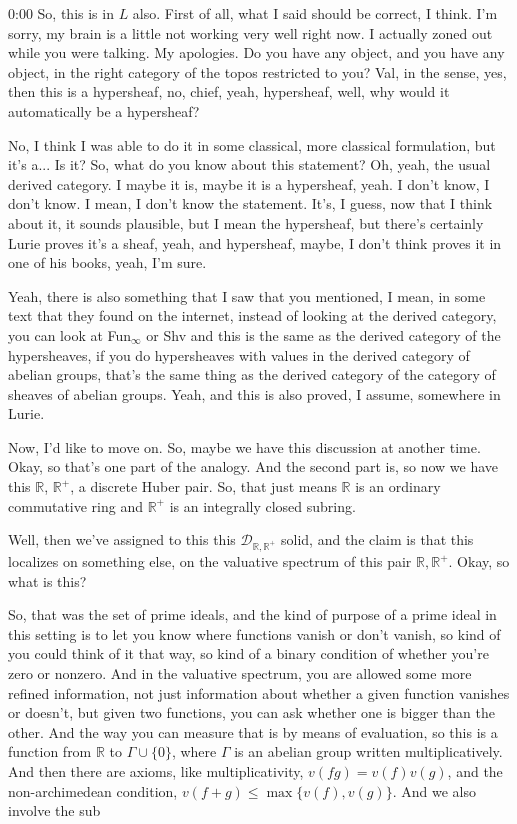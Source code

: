 \begin{unfinished}{0:00}
So, this is in $L$ also. First of all, what I said should be correct, I think. I'm sorry, my brain is a little not working very well right now. I actually zoned out while you were talking. My apologies. Do you have any object, and you have any object, in the right category of the topos restricted to you? Val, in the sense, yes, then this is a hypersheaf, no, chief, yeah, hypersheaf, well, why would it automatically be a hypersheaf?

No, I think I was able to do it in some classical, more classical formulation, but it's a... Is it? So, what do you know about this statement? Oh, yeah, the usual derived category. I maybe it is, maybe it is a hypersheaf, yeah. I don't know, I don't know. I mean, I don't know the statement. It's, I guess, now that I think about it, it sounds plausible, but I mean the hypersheaf, but there's certainly Lurie proves it's a sheaf, yeah, and hypersheaf, maybe, I don't think proves it in one of his books, yeah, I'm sure.

Yeah, there is also something that I saw that you mentioned, I mean, in some text that they found on the internet, instead of looking at the derived category, you can look at Fun$_\infty$ or Shv and this is the same as the derived category of the hypersheaves, if you do hypersheaves with values in the derived category of abelian groups, that's the same thing as the derived category of the category of sheaves of abelian groups. Yeah, and this is also proved, I assume, somewhere in Lurie.

Now, I'd like to move on. So, maybe we have this discussion at another time. Okay, so that's one part of the analogy. And the second part is, so now we have this $\mathbb{R}$, $\mathbb{R}^+$, a discrete Huber pair. So, that just means $\mathbb{R}$ is an ordinary commutative ring and $\mathbb{R}^+$ is an integrally closed subring.

Well, then we've assigned to this this $\mathcal{D}_{\mathbb{R},\mathbb{R}^+}$ solid, and the claim is that this localizes on something else, on the valuative spectrum of this pair $\mathbb{R}, \mathbb{R}^+$. Okay, so what is this? 

So, that was the set of prime ideals, and the kind of purpose of a prime ideal in this setting is to let you know where functions vanish or don't vanish, so kind of you could think of it that way, so kind of a binary condition of whether you're zero or nonzero. And in the valuative spectrum, you are allowed some more refined information, not just information about whether a given function vanishes or doesn't, but given two functions, you can ask whether one is bigger than the other. And the way you can measure that is by means of evaluation, so this is a function from $\mathbb{R}$ to $\Gamma \cup \{0\}$, where $\Gamma$ is an abelian group written multiplicatively. And then there are axioms, like multiplicativity, $v(fg) = v(f)v(g)$, and the non-archimedean condition, $v(f+g) \le \max\{v(f), v(g)\}$. And we also involve the sub


\end{unfinished}
